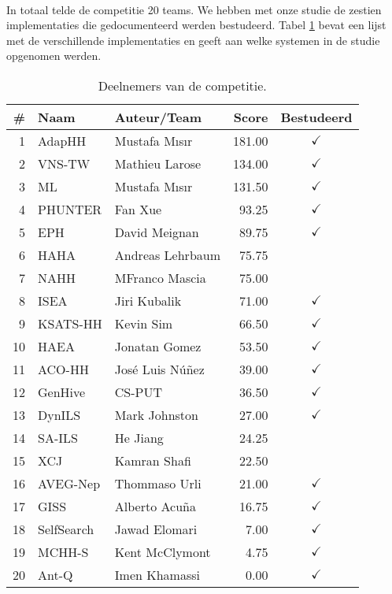 \paragraph{}
In totaal telde de competitie 20 teams. We hebben met onze studie de zestien implementaties die gedocumenteerd werden bestudeerd. Tabel \ref{tbl:chescParticipants} bevat een lijst met de verschillende implementaties en geeft aan welke systemen in de studie opgenomen werden.

\begin{table}[hbt]
  \centering
  \begin{tabular}{rllrc} \toprule
    \#&Naam&Auteur/Team&Score&Bestudeerd\\\midrule
    1&	AdapHH\cite{chesc-adaphh,chesc-adaphh2}&		Mustafa M\i{}s\i{}r&	181.00&	$\checkmark$\\
    2&	VNS-TW\cite{chesc-vns-tw}&				Mathieu Larose&		134.00&	$\checkmark$\\
    3&	ML\cite{chesc-ml,chesc-ml2}&				Mustafa M\i{}s\i{}r&	131.50&	$\checkmark$\\
    4&	PHUNTER\cite{chesc-phunter}&				Fan Xue&		93.25&	$\checkmark$\\
    5&	EPH\cite{chesc-eph}&					David Meignan&		89.75&	$\checkmark$\\
    6&	HAHA&							Andreas Lehrbaum&	75.75&	\\
    7&	NAHH&							MFranco Mascia&		75.00&	\\
    8&	ISEA\cite{chesc-isea}&					Jiri Kubalik&		71.00&	$\checkmark$\\
    9&	KSATS-HH\cite{chesc-ksats-hh}&				Kevin Sim&		66.50&	$\checkmark$\\
    10&	HAEA\cite{chesc-haea}&					Jonatan Gomez&		53.50&	$\checkmark$\\
    11&	ACO-HH\cite{chesc-aco-hh}&				Jos\'e Luis N\'u\~nez&	39.00&	$\checkmark$\\
    12&	GenHive\cite{chesc-genhive}&				CS-PUT&			36.50&	$\checkmark$\\
    13&	DynILS\cite{chesc-dynils}&				Mark Johnston&		27.00&	$\checkmark$\\
    14&	SA-ILS&							He Jiang&		24.25&	\\
    15&	XCJ&							Kamran Shafi&		22.50&	\\
    16&	AVEG-Nep\cite{chesc-aveg-nep}&				Thommaso Urli&		21.00&	$\checkmark$\\
    17&	GISS\cite{chesc-giss}&					Alberto Acu\~na&	16.75&	$\checkmark$\\
    18&	SelfSearch\cite{chesc-selfsearch}&			Jawad Elomari&		7.00&	$\checkmark$\\
    19&	MCHH-S\cite{chesc-mchh-s}&				Kent McClymont&		4.75&	$\checkmark$\\
    20&	Ant-Q\cite{chesc-ant-q}&				Imen Khamassi&		0.00&	$\checkmark$\\
    \bottomrule
  \end{tabular}
  \caption{Deelnemers van de \abchescy{} competitie\cite{chesc-results}.}
  \label{tbl:chescParticipants}
\end{table}


